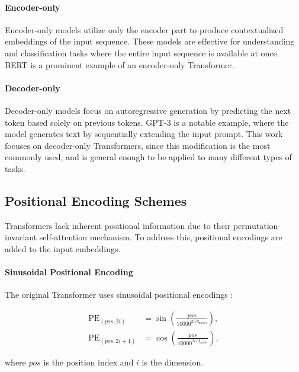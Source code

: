 \paragraph{Encoder-only}

Encoder-only models utilize only the encoder part to produce contextualized embeddings of the input sequence. These models are effective for understanding and classification tasks where the entire input sequence is available at once. BERT \parencite{devlin_bert_2019} is a prominent example of an encoder-only Transformer.

\paragraph{Decoder-only}

Decoder-only models focus on autoregressive generation by predicting the next token based solely on previous tokens. GPT-3 \parencite{brown_language_2020} is a notable example, where the model generates text by sequentially extending the input prompt. This work focuses on decoder-only Transformers, since this modification is the most commonly used, and is general enough to be applied to many different types of tasks.

\subsection{Positional Encoding Schemes}\label{subsec:positional_encoding}

Transformers lack inherent positional information due to their permutation-invariant self-attention mechanism. To address this, positional encodings are added to the input embeddings.

\paragraph{Sinusoidal Positional Encoding}

The original Transformer uses sinusoidal positional encodings \parencite{vaswani_attention_2017}:

\begin{align}
    \text{PE}_{(pos, 2i)}   & = \sin\left(\frac{pos}{10000^{2i/d_{\text{model}}}}\right), \\
    \text{PE}_{(pos, 2i+1)} & = \cos\left(\frac{pos}{10000^{2i/d_{\text{model}}}}\right),
\end{align}

where $pos$ is the position index and $i$ is the dimension.

